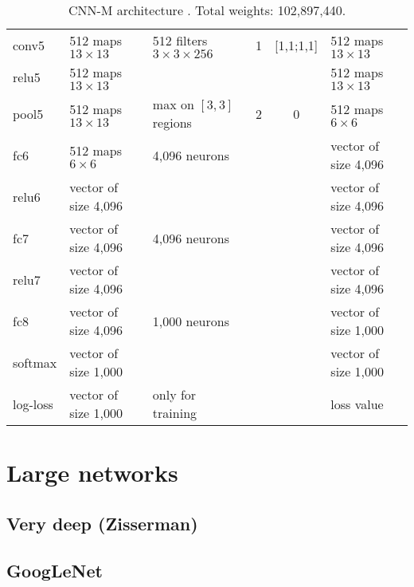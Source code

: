 \begin{table}[h]
\begin{center}
\begin{tabular}{|l||l||l|c|c||l|}
   \hline
   conv5      & 512 maps $13 \times 13$          & 512 filters $3 \times 3 \times 256$     & 1      & [1,1;1,1] & 512 maps $13 \times 13$  \\
   relu5      & 512 maps $13 \times 13$          &                                         &        &           & 512 maps $13 \times 13$  \\
   pool5      & 512 maps $13 \times 13$          & max on $[3,3]$ regions                  & 2      & 0         & 512 maps $6 \times 6$    \\
   \hline
   fc6        & 512 maps $6 \times 6$            & 4,096 neurons                           &        &           & vector of size 4,096     \\
   relu6      & vector of size 4,096             &                                         &        &           & vector of size 4,096     \\
   \hline
   fc7        & vector of size 4,096             & 4,096 neurons                           &        &           & vector of size 4,096     \\
   relu7      & vector of size 4,096             &                                         &        &           & vector of size 4,096     \\
   \hline
   fc8        & vector of size 4,096             & 1,000 neurons                           &        &           & vector of size 1,000     \\
   softmax    & vector of size 1,000             &                                         &        &           & vector of size 1,000     \\
   log-loss   & vector of size 1,000             & only for training                       &        &           & loss value               \\
   \hline 
 \end{tabular}
 \caption{CNN-M architecture \cite{Chatfield14}. Total weights: 102,897,440.}
 \label{table:CIFAR}
\end{center}
\end{table} 










\section{Large networks}

\subsection{Very deep (Zisserman)}

\subsection{GoogLeNet}





